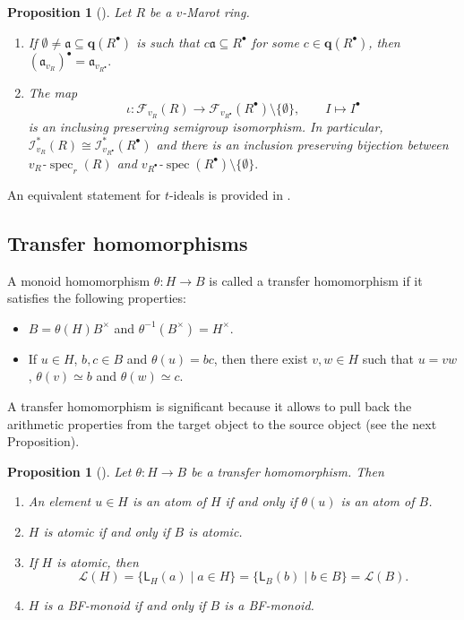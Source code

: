 \documentclass[a4paper, 10pt]{amsart}
\newcommand{\defit}[1]{{\textsf{#1}}}
\theoremstyle{plain}
\newtheorem{proposition}[theorem]{Proposition}
\theoremstyle{definition}
\theoremstyle{remark}
\DeclareMathOperator{\spec}{spec}
\numberwithin{equation}{section}
\begin{document}
\begin{proposition}[{\cite[Theorem 3.5]{GRR15}}]\label{class group thm}
    Let $R$ be a $v$-Marot ring. \begin{enumerate}
        \item If $\emptyset\ne\mathfrak{a}\subseteq \mathbf{q}(R^\bullet)$ is such that $c\mathfrak{a}\subseteq R^\bullet$ for some $c\in \mathbf{q}(R^\bullet)$, then $(\mathfrak a_{v_R})^\bullet=\mathfrak{a}_{v_{R^\bullet}}.$
        \item The map \[\iota\colon \mathcal{F}_{v_R}(R)\to \mathcal{F}_{v_{R^{\bullet}}}(R^\bullet)\setminus\{\emptyset\},\qquad I\mapsto I^\bullet\] is an inclusing preserving semigroup isomorphism. In particular, $\mathcal{I}^*_{v_R}(R)\cong \mathcal{I}_{v_{R^{\bullet}}}^*(R^\bullet)$ and there is an inclusion preserving bijection between ${v_R}$-$\spec_r(R)$ and ${v_{R^{\bullet}}}$-$\spec(R^\bullet)\setminus\{\emptyset\}.$
    \end{enumerate}
\end{proposition}
An equivalent statement for $t$-ideals is provided in \cite[Theorem 2.7]{CO22}.
\subsection{Transfer homomorphisms}
A monoid homomorphism $\theta : H \to B$ is called a \defit{transfer homomorphism} if it satisfies the following properties: 
\begin{itemize}
	\item[\bf{(T1)}] $B=\theta(H)B^{\times}$ and $\theta^{-1}(B^{\times})=H^{\times}$.
	\item[\bf{(T2)}] If $u \in  H$, $b, c \in B$ and $\theta(u)=bc$, then there exist $v,w \in H$ such that $u=vw$, $\theta(v)\simeq b$ and $\theta(w)\simeq c$.
\end{itemize}
 A transfer homomorphism is significant because it allows to pull back the arithmetic properties from the target object to the source object (see the next Proposition).

\begin{proposition}[{\cite[Proposition 3.2.3]{GHK06}}]\label{proptransfhomo}
    Let $\theta\colon H\to B$ be a transfer homomorphism. Then \begin{enumerate}[label=\textup{(}\normalfont \arabic*\textup{)}]
        \item An element $u\in H$ is an atom of $H$ if and only if $\theta(u)$ is an atom of $B$.
        \item $H$ is atomic if and only if $B$ is atomic.
        \item If $H$ is atomic, then \[\mathcal{L}(H)=\{\mathsf L_H(a)\mid a\in H\}=\{\mathsf L_B(b)\mid b \in B\}=\mathcal{L}(B).\]
        \item $H$ is a BF-monoid if and only if $B$ is a BF-monoid.
    \end{enumerate}
\end{proposition}
\end{document}
